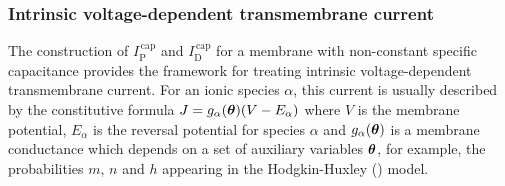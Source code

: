 \subsubsection{Intrinsic voltage-dependent transmembrane current}
The construction of $I^\mathrm{\,cap}_\mathrm{P}$ and
$I^\mathrm{\,cap}_\mathrm{D}$ for a membrane with non-constant
specific capacitance provides the framework for treating intrinsic
voltage-dependent transmembrane current. For an ionic species
$\alpha$, this current is usually described by the constitutive
formula $J=g_\alpha(\boldsymbol{\theta})(V-E_\alpha)$ where $V$ is the
membrane potential, $E_\alpha$ is the reversal potential for
species $\alpha$ and $g_\alpha(\boldsymbol{\theta})$ is a membrane
conductance which depends on a set of auxiliary variables
$\boldsymbol{\theta}$, for example, the probabilities $m$, $n$ and $h$
appearing in the Hodgkin-Huxley (\cite{Hodgkin52}) model.

